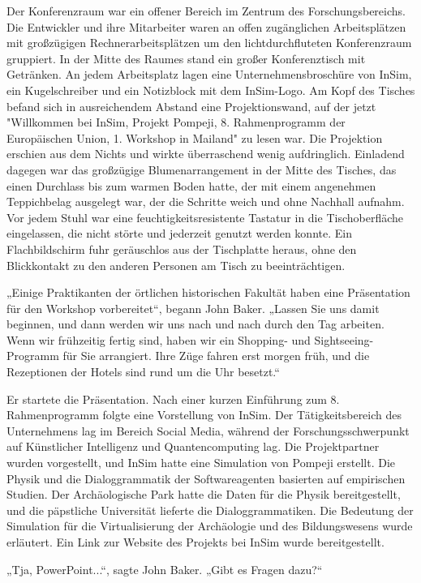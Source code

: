 \documentclass[
]{article}
\begin{document}
Der Konferenzraum war ein offener Bereich im Zentrum des
Forschungsbereichs. Die Entwickler und ihre Mitarbeiter waren an offen
zugänglichen Arbeitsplätzen mit großzügigen Rechnerarbeitsplätzen um den
lichtdurchfluteten Konferenzraum gruppiert. In der Mitte des Raumes
stand ein großer Konferenztisch mit Getränken. An jedem Arbeitsplatz
lagen eine Unternehmensbroschüre von InSim, ein Kugelschreiber und ein
Notizblock mit dem InSim-Logo. Am Kopf des Tisches befand sich in
ausreichendem Abstand eine Projektionswand, auf der jetzt "Willkommen
bei InSim, Projekt Pompeji, 8. Rahmenprogramm der Europäischen Union, 1.
Workshop in Mailand" zu lesen war. Die Projektion erschien aus dem
Nichts und wirkte überraschend wenig aufdringlich. Einladend dagegen war
das großzügige Blumenarrangement in der Mitte des Tisches, das einen
Durchlass bis zum warmen Boden hatte, der mit einem angenehmen
Teppichbelag ausgelegt war, der die Schritte weich und ohne Nachhall
aufnahm. Vor jedem Stuhl war eine feuchtigkeitsresistente Tastatur in
die Tischoberfläche eingelassen, die nicht störte und jederzeit genutzt
werden konnte. Ein Flachbildschirm fuhr geräuschlos aus der Tischplatte
heraus, ohne den Blickkontakt zu den anderen Personen am Tisch zu
beeinträchtigen.

„Einige Praktikanten der örtlichen historischen Fakultät haben eine
Präsentation für den Workshop vorbereitet``, begann John Baker. „Lassen
Sie uns damit beginnen, und dann werden wir uns nach und nach durch den
Tag arbeiten. Wenn wir frühzeitig fertig sind, haben wir ein Shopping-
und Sightseeing-Programm für Sie arrangiert. Ihre Züge fahren erst
morgen früh, und die Rezeptionen der Hotels sind rund um die Uhr
besetzt.``

Er startete die Präsentation. Nach einer kurzen Einführung zum 8.
Rahmenprogramm folgte eine Vorstellung von InSim. Der Tätigkeitsbereich
des Unternehmens lag im Bereich Social Media, während der
Forschungsschwerpunkt auf Künstlicher Intelligenz und Quantencomputing
lag. Die Projektpartner wurden vorgestellt, und InSim hatte eine
Simulation von Pompeji erstellt. Die Physik und die Dialoggrammatik der
Softwareagenten basierten auf empirischen Studien. Der Archäologische
Park hatte die Daten für die Physik bereitgestellt, und die päpstliche
Universität lieferte die Dialoggrammatiken. Die Bedeutung der Simulation
für die Virtualisierung der Archäologie und des Bildungswesens wurde
erläutert. Ein Link zur Website des Projekts bei InSim wurde
bereitgestellt.

„Tja, PowerPoint...``, sagte John Baker. „Gibt es Fragen
dazu?{\kern0pt}``
\end{document}
